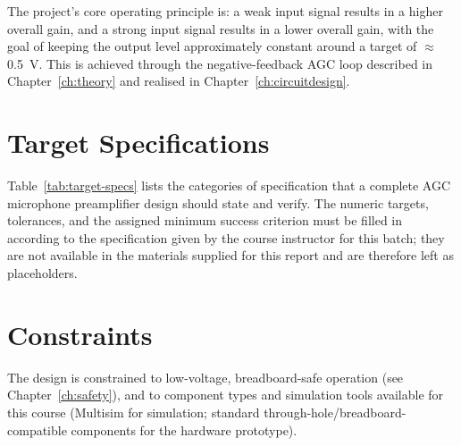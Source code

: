 The project's core operating principle is: a weak input signal results in a higher overall gain, and a strong input signal results in a lower overall gain, with the goal of keeping the output level approximately constant around a target of $\approx$0.5~V. This is achieved through the negative-feedback AGC loop described in Chapter~\ref{ch:theory} and realised in Chapter~\ref{ch:circuitdesign}.

\section{Target Specifications}

Table~\ref{tab:target-specs} lists the categories of specification that a complete AGC microphone preamplifier design should state and verify. The numeric targets, tolerances, and the assigned minimum success criterion must be filled in according to the specification given by the course instructor for this batch; they are not available in the materials supplied for this report and are therefore left as placeholders.



\section{Constraints}

The design is constrained to low-voltage, breadboard-safe operation (see Chapter~\ref{ch:safety}), and to component types and simulation tools available for this course (Multisim for simulation; standard through-hole/breadboard-compatible components for the hardware prototype). 
